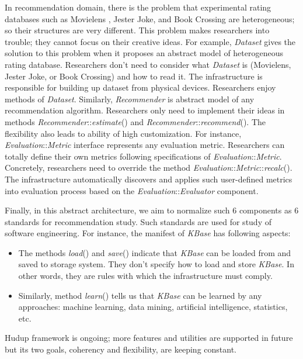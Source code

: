 \documentclass[a4paper,twoside]{article}
\begin{document}
In recommendation domain, there is the problem that experimental rating databases such as Movielens \cite{movielens}, Jester Joke, and Book Crossing are heterogeneous; so their structures are very different. This problem makes researchers into trouble; they cannot focus on their creative ideas. For example, \textit{Dataset} gives the solution to this problem when it proposes an abstract model of heterogeneous rating database. Researchers don't need to consider what \textit{Dataset} is (Movielens, Jester Joke, or Book Crossing) and how to read it. The infrastructure is responsible for building up dataset from physical devices. Researchers enjoy methods of \textit{Dataset}. Similarly, \textit{Recommender} is abstract model of any recommendation algorithm. Researchers only need to implement their ideas in methods \textit{Recommender}::\textit{estimate}() and \textit{Recommender}::\textit{recommend}(). The flexibility also leads to ability of high customization. For instance, \textit{Evaluation}::\textit{Metric} interface represents any evaluation metric. Researchers can totally define their own metrics following specifications of \textit{Evaluation}::\textit{Metric}. Concretely, researchers need to override the method \textit{Evaluation}::\textit{Metric}::\textit{recalc}(). The infrastructure automatically discovers and applies such user-defined metrics into evaluation process based on the \textit{Evaluation}::\textit{Evaluator} component.

Finally, in this abstract architecture, we aim to normalize such 6 components as 6 standards for recommendation study. Such standards are used for study of software engineering. For instance, the manifest of \textit{KBase} has following aspects:
\begin{itemize}
\item The methods \textit{load}() and \textit{save}() indicate that \textit{KBase} can be loaded from and saved to storage system. They don't specify how to load and store \textit{KBase}. In other words, they are rules with which the infrastructure must comply.
\item Similarly, method \textit{learn}() tells us that \textit{KBase} can be learned by any approaches: machine learning, data mining, artificial intelligence, statistics, etc.
\end{itemize}
Hudup framework is ongoing; more features and utilities are supported in future but its two goals, coherency and flexibility, are keeping constant.
\end{document}
